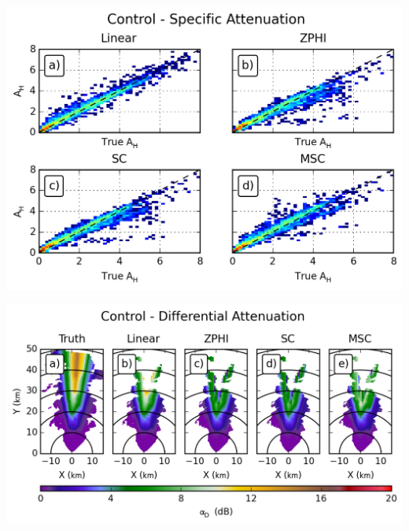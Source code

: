 \documentclass[red]{beamer}
\begin{document}
\begin{frame}
    \begin{center}
        \includegraphics[scale=0.7]{figures/spatial/X_Control_Specific_Attenuation_H_scatter}
    \end{center}
\end{frame}

\begin{frame}
    \begin{center}
        \includegraphics[scale=0.7]{figures/spatial/X_Control_Differential_Attenuation}
    \end{center}
\end{frame}
\end{document}
